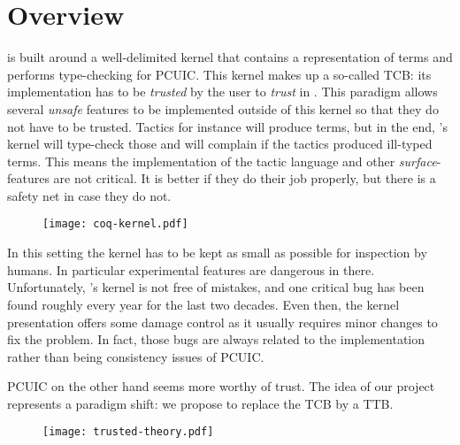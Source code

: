 \chapter{Overview}

\Coq is built around a well-delimited kernel that contains a representation of
terms and performs type-checking for \acrshort{PCUIC}.
This kernel makes up a so-called \acrlong{TCB}: its \ocaml implementation has to
be \emph{trusted} by the user to \emph{trust} in \Coq. This paradigm allows
several \emph{unsafe} features to be implemented outside of this kernel so that
they do not have to be trusted. Tactics for instance will produce terms, but in
the end, \Coq's kernel will type-check those and will complain if the tactics
produced ill-typed terms. This means the implementation of the tactic language
and other \emph{surface}-features are not critical. It is better if they do
their job properly, but there is a safety net in case they do not.
\begin{figure}[hb]
  \texttt{[image: coq-kernel.pdf]}
\end{figure}

In this setting the kernel has to be kept as small as possible for inspection
by humans. In particular experimental features are dangerous in there.
Unfortunately, \Coq's kernel is not free of mistakes, and one critical bug has
been found roughly every year for the last two decades. Even then, the kernel
presentation offers some damage control as it usually requires minor changes to
fix the problem.
In fact, those bugs are always related to the implementation rather than being
consistency issues of \acrshort{PCUIC}.

\acrshort{PCUIC} on the other hand seems more worthy of trust. The idea of our
project~ represents a paradigm shift: we propose to
replace the \acrshort{TCB} by a \acrfull{TTB}.
\begin{figure}[hb]
  \texttt{[image: trusted-theory.pdf]}
\end{figure}

